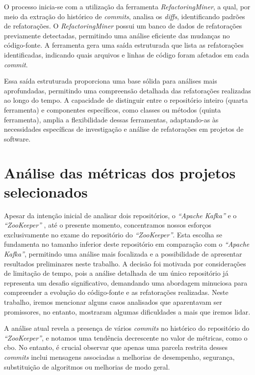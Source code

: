 O processo inicia-se com a utilização da ferramenta \textit{RefactoringMiner}, a qual, por meio da extração do histórico de \textit{commits}, analisa os \textit{diffs}, identificando padrões de refatorações. O \textit{RefactoringMiner} possui um banco de dados de refatorações previamente detectadas, permitindo uma análise eficiente das mudanças no código-fonte. A ferramenta gera uma saída estruturada que lista as refatorações identificadas, indicando quais arquivos e linhas de código foram afetados em cada \textit{commit}.

Essa saída estruturada proporciona uma base sólida para análises mais aprofundadas, permitindo uma compreensão detalhada das refatorações realizadas ao longo do tempo. A capacidade de distinguir entre o repositório inteiro (quarta ferramenta) e componentes específicos, como classes ou métodos (quinta ferramenta), amplia a flexibilidade dessas ferramentas, adaptando-as às necessidades específicas de investigação e análise de refatorações em projetos de software.

\section{Análise das métricas dos projetos selecionados}
Apesar da intenção inicial de analisar dois repositórios, o \textit{``Apache Kafka''} \cite{KafkaGitHub} e o \textit{``ZooKeeper''} \cite{ZookeeperGitHub}, até o presente momento, concentramos nossos esforços exclusivamente no exame do repositório do \textit{``ZooKeeper''}. Esta escolha se fundamenta no tamanho inferior deste repositório em comparação com o \textit{``Apache Kafka''}, permitindo uma análise mais focalizada e a possibilidade de apresentar resultados preliminares neste trabalho. A decisão foi motivada por considerações de limitação de tempo, pois a análise detalhada de um único repositório já representa um desafio significativo, demandando uma abordagem minuciosa para compreender a evolução do código-fonte e as refatorações realizadas.  Neste trabalho, iremos mencionar alguns casos analisados que aparentavam ser promissores, no entanto, mostraram algumas dificuldades a mais que iremos lidar.

A análise atual revela a presença de vários \textit{commits} no histórico do repositório do \textit{``ZooKeeper''}, e notamos uma tendência decrescente no valor de métricas, como o \gls{cbo}. No entanto, é crucial observar que apenas uma parcela restrita desses \textit{commits} inclui mensagens associadas a melhorias de desempenho, segurança, substituição de algoritmos ou melhorias de modo geral. 

